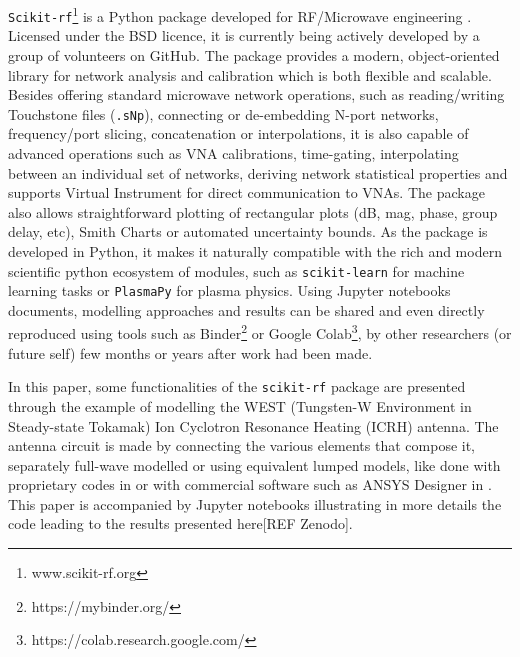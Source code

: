 \documentclass{aip-cp}
\begin{document}
	\texttt{Scikit-rf}\footnote{www.scikit-rf.org} is a Python package developed for RF/Microwave engineering  \cite{Arsenovic2018}. Licensed under the BSD licence, it is currently being actively developed by a group of volunteers on GitHub. The package provides a modern, object-oriented library for network analysis and calibration which is both flexible and scalable. Besides offering standard microwave network operations, such as reading/writing Touchstone files (\texttt{.sNp}), connecting or de-embedding N-port networks, frequency/port slicing, concatenation or interpolations, it is also capable of advanced operations such as VNA calibrations, time-gating, interpolating between an individual set of networks, deriving network statistical properties and supports Virtual Instrument for direct communication to VNAs. The package also allows straightforward plotting of rectangular plots (dB, mag, phase, group delay, etc), Smith Charts or automated uncertainty bounds. As the package is developed in Python, it makes it naturally compatible with the rich and modern scientific python ecosystem of modules\cite{Millman2011}, such as \texttt{scikit-learn} for machine learning tasks \cite{scikit-learn} or \texttt{PlasmaPy} \cite{PlasmaPyCommunity2018} for plasma physics. Using Jupyter notebooks documents\cite{Kluyver2016}, modelling approaches and results can be shared and even directly reproduced using tools such as Binder\footnote{https://mybinder.org/} or Google Colab\footnote{https://colab.research.google.com/}, by other researchers (or future self) few months or years after work had been made.
	
	In this paper, some functionalities of the \texttt{scikit-rf} package are presented through the example of modelling the WEST (Tungsten-W Environment in Steady-state Tokamak) Ion Cyclotron Resonance Heating (ICRH) antenna. The antenna circuit is made by connecting the various elements that compose it, separately full-wave modelled or using equivalent lumped models, like done with proprietary codes in \cite{Durodie2015, Helou2015_SIDON} or with commercial software such as ANSYS Designer in \cite{Hillairet2015}. This paper is accompanied by Jupyter notebooks illustrating in more details the code leading to the results presented here[REF Zenodo].
	
	
	
\end{document}
